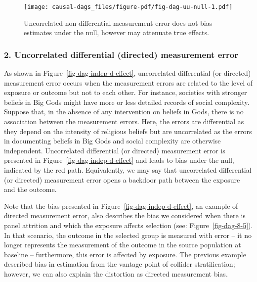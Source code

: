 \documentclass[
  singlecolumn]{article}
\begin{document}
\begin{figure}

{\centering \texttt{[image: causal-dags\_files/figure-pdf/fig-dag-uu-null-1.pdf]}

}

\caption{\label{fig-dag-uu-null}Uncorrelated non-differential
measurement error does not bias estimates under the null, however may
attenuate true effects.}

\end{figure}

\hypertarget{uncorrelated-differential-directed-measurement-error}{%
\subsubsection{2. Uncorrelated differential (directed) measurement
error}\label{uncorrelated-differential-directed-measurement-error}}

As shown in Figure~\ref{fig-dag-indep-d-effect}, uncorrelated
differential (or directed) measurement error occurs when the measurement
errors are related to the level of exposure or outcome but not to each
other. For instance, societies with stronger beliefs in Big Gods might
have more or less detailed records of social complexity. Suppose that,
in the absence of any intervention on beliefs in Gods, there is no
association between the measurement errors. Here, the errors are
differential as they depend on the intensity of religious beliefs but
are uncorrelated as the errors in documenting beliefs in Big Gods and
social complexity are otherwise independent. Uncorrelated differential
(or directed) measurement error is presented in
Figure~\ref{fig-dag-indep-d-effect} and leads to bias under the null,
indicated by the red path. Equivalently, we may say that uncorrelated
differential (or directed) measurement error opens a backdoor path
between the exposure and the outcome.

Note that the bias presented in Figure~\ref{fig-dag-indep-d-effect}, an
example of directed measurement error, also describes the bias we
considered when there is panel attrition and which the exposure affects
selection (see: Figure~\ref{fig-dag-8-5}). In that scenario, the outcome
in the selected group is measured with error -- it no longer represents
the measurement of the outcome in the source population at baseline --
furthermore, this error is affected by exposure. The previous example
described bias in estimation from the vantage point of collider
stratification; however, we can also explain the distortion as directed
measurement bias.
\end{document}

